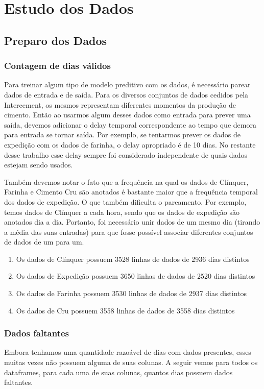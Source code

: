 
\chapter{Estudo dos Dados}
\label{cap:estudodados}


\section{Preparo dos Dados}

\subsection{Contagem de dias válidos}

Para treinar algum tipo de modelo preditivo com os dados, é necessário parear dados de entrada e de saída. Para os diversos conjuntos de dados cedidos pela Intercement, os mesmos representam diferentes momentos da produção de cimento. Então ao usarmos algum desses dados como entrada para prever uma saída, devemos adicionar o delay temporal correspondente ao tempo que demora para entrada se tornar saída. Por exemplo, se tentarmos prever os dados de expedição com os dados de farinha, o delay apropriado é de 10 dias. No restante desse trabalho esse delay sempre foi considerado independente de quais dados estejam sendo usados.

Também devemos notar o fato que a frequência na qual os dados de Clínquer, Farinha e Cimento Cru são anotados é bastante maior que a frequência temporal dos dados de expedição. O que também dificulta o pareamento. Por exemplo, temos dados de Clínquer a cada hora, sendo que os dados de expedição são anotados dia a dia. Portanto, foi necessário unir dados de um mesmo dia (tirando a média das suas entradas) para que fosse possível associar diferentes conjuntos de dados de um para um.
\begin{enumerate}
    \item Os dados de  Clínquer possuem 3528 linhas de dados de 2936 dias distintos
\item Os dados de  Expedição possuem 3650 linhas de dados de 2520 dias distintos
\item Os dados de  Farinha possuem 3530 linhas de dados de 2937 dias distintos
\item Os dados de  Cru possuem 3558 linhas de dados de 3558 dias distintos
\end{enumerate}

\subsection{Dados faltantes}
Embora tenhamos uma quantidade razoável de dias com dados presentes, esses muitas vezes não possuem alguma de suas colunas.
A seguir vemos para todos os dataframes, para cada uma de suas colunas, quantos dias possuem dados faltantes.



